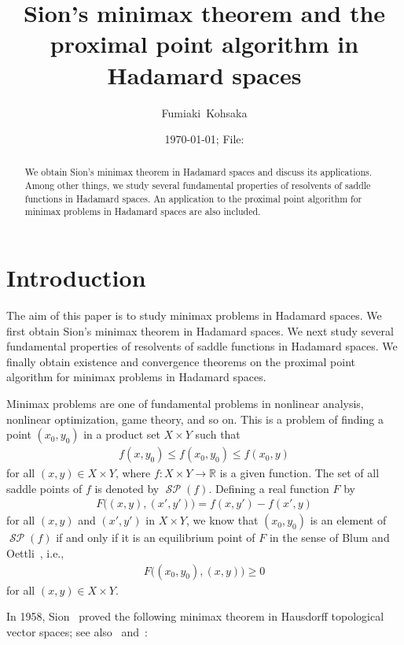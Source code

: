 \documentclass[draft]{amsart}
\title[] 
{Sion's minimax theorem and the proximal point algorithm in Hadamard spaces}
\author[F.~Kohsaka]{Fumiaki~Kohsaka}
\date{\today; File: \jobname}
\numberwithin{equation}{section}
\def\R{\mathbb R}
\DeclareMathOperator{\Saddle}{\mathcal{SP}}
\theoremstyle{plain}
\theoremstyle{definition}
\theoremstyle{remark}
\begin{document}
%

\begin{abstract}
 We obtain Sion's minimax theorem in Hadamard spaces and 
 discuss its applications. Among other things, we study 
 several fundamental properties of resolvents of 
 saddle functions in Hadamard spaces. An application to 
 the proximal point algorithm for minimax problems 
 in Hadamard spaces are also included. 
\end{abstract}
%
\maketitle

\section{Introduction}

The aim of this paper is to study minimax problems in Hadamard spaces. 
We first obtain Sion's minimax theorem in Hadamard spaces. 
We next study several fundamental properties of resolvents of 
saddle functions in Hadamard spaces. We finally obtain 
existence and convergence theorems on the proximal point algorithm 
for minimax problems in Hadamard spaces.  

Minimax problems are one of fundamental problems in 
nonlinear analysis, nonlinear optimization, game theory, and so on. 
This is a problem of finding a point 
$(x_0,y_0)$ in a product set $X\times Y$ such that 
\begin{align}
 f(x,y_0)\leq f(x_0,y_0)\leq f(x_0,y)
\end{align}
for all $(x,y)\in X\times Y$, where 
$f\colon X\times Y\to \R$ is a given function. 
The set of all saddle points of $f$ is denoted by 
$\Saddle (f)$. 
Defining a real function $F$ by 
\begin{align}
F\bigl((x,y), (x',y')\bigr) = f(x,y') -f(x',y) 
\end{align}
for all $(x,y)$ and $(x',y')$ in $X\times Y$, 
we know that $(x_0,y_0)$ is an element of $\Saddle(f)$ 
if and only if it is an equilibrium point of $F$ in the 
sense of Blum and Oettli~\cite{MR1292380}, i.e., 
\begin{align}
 F\bigl((x_0,y_0), (x,y)\bigr) \geq 0
\end{align}
for all $(x,y)\in X\times Y$. 

In 1958, Sion~\cite{MR0097026} proved the following minimax theorem 
in Hausdorff topological vector spaces; 
see also~\cite[Theorem~16]{MR0399979} and~\cite[Theorem~6.3.3]{MR1864294}: 
\end{document}

